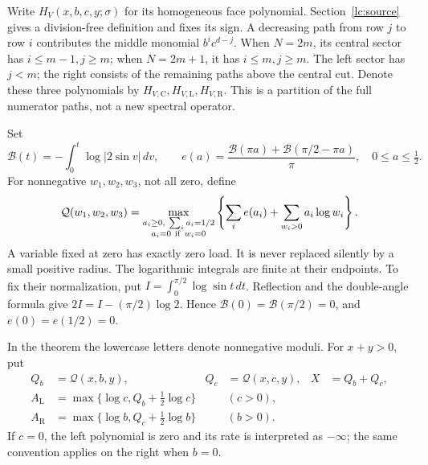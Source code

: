 \documentclass[11pt]{article}
\numberwithin{equation}{section}
\theoremstyle{remark}\newtheorem{remark}[theorem]{Remark}
\begin{document}
Write \(H_V(x,b,c,y;\sigma)\) for its homogeneous face polynomial.
Section~\ref{lc:source} gives a division-free definition and fixes its
sign. A decreasing path from row \(j\) to row \(i\) contributes the
middle monomial \(b^ic^{d-j}\). When \(N=2m\), its central sector
has \(i\le m-1,j\ge m\); when \(N=2m+1\), it has \(i\le m,j\ge m\).
The left sector has \(j<m\); the right consists of the remaining
paths above the central cut. Denote these three polynomials by
\(H_{V,\mathrm C},H_{V,\mathrm L},H_{V,\mathrm R}\).
This is a partition of the full numerator paths, not a new spectral
operator.

Set
\[
 \mathcal B(t)=-\int_0^t\log|2\sin v|\,dv,\qquad
 e(a)=\frac{\mathcal B(\pi a)+\mathcal B(\pi/2-\pi a)}{\pi},
 \quad 0\le a\le\tfrac12.
\]
For nonnegative \(w_1,w_2,w_3\), not all zero, define
\begin{equation}\label{lc:entropy}
 \mathcal Q(w_1,w_2,w_3)=
 \max_{\substack{a_i\ge0,\ \sum_i a_i=1/2\\a_i=0\ {\rm if}\ w_i=0}}
 \left\{\sum_i e(a_i)+\sum_{w_i>0}a_i\log w_i\right\}.
\end{equation}
A variable fixed at zero has exactly zero load. It is never replaced
silently by a small positive radius. The logarithmic integrals are
finite at their endpoints. To fix their normalization, put
\(I=\int_0^{\pi/2}\log\sin t\,dt\). Reflection and the double-angle
formula give \(2I=I-(\pi/2)\log2\). Hence
\(\mathcal B(0)=\mathcal B(\pi/2)=0\), and \(e(0)=e(1/2)=0\).

In the theorem the lowercase letters denote nonnegative moduli.
For \(x+y>0\), put
\begin{equation}\label{lc:rates}
\begin{aligned}
 Q_b&=\mathcal Q(x,b,y),&Q_c&=\mathcal Q(x,c,y),&X&=Q_b+Q_c,\\
 A_{\mathrm L}&=\max\{\log c,Q_b+\tfrac12\log c\}&&(c>0),\\
 A_{\mathrm R}&=\max\{\log b,Q_c+\tfrac12\log b\}&&(b>0).
\end{aligned}
\end{equation}
If \(c=0\), the left polynomial is zero and its rate is interpreted
as \(-\infty\); the same convention applies on the right when \(b=0\).
\end{document}

